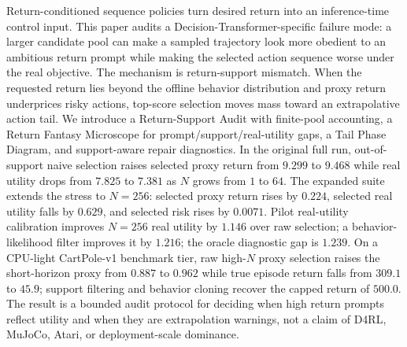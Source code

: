 Return-conditioned sequence policies turn desired return into an inference-time control input. This paper audits a Decision-Transformer-specific failure mode: a larger candidate pool can make a sampled trajectory look more obedient to an ambitious return prompt while making the selected action sequence worse under the real objective. The mechanism is return-support mismatch. When the requested return lies beyond the offline behavior distribution and proxy return underprices risky actions, top-score selection moves mass toward an extrapolative action tail. We introduce a Return-Support Audit with finite-pool accounting, a Return Fantasy Microscope for prompt/support/real-utility gaps, a Tail Phase Diagram, and support-aware repair diagnostics. In the original full run, out-of-support naive selection raises selected proxy return from $9.299$ to $9.468$ while real utility drops from $7.825$ to $7.381$ as $N$ grows from $1$ to $64$. The expanded suite extends the stress to $N=256$: selected proxy return rises by $0.224$, selected real utility falls by $0.629$, and selected risk rises by $0.0071$. Pilot real-utility calibration improves $N=256$ real utility by $1.146$ over raw selection; a behavior-likelihood filter improves it by $1.216$; the oracle diagnostic gap is $1.239$. On a CPU-light CartPole-v1 benchmark tier, raw high-$N$ proxy selection raises the short-horizon proxy from $0.887$ to $0.962$ while true episode return falls from $309.1$ to $45.9$; support filtering and behavior cloning recover the capped return of $500.0$. The result is a bounded audit protocol for deciding when high return prompts reflect utility and when they are extrapolation warnings, not a claim of D4RL, MuJoCo, Atari, or deployment-scale dominance.
